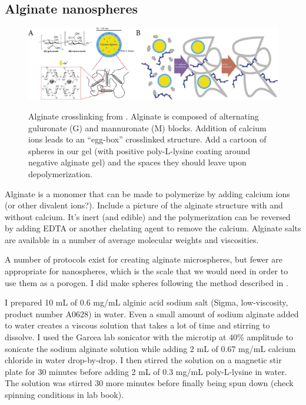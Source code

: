 \subsection{Alginate nanospheres}
\begin{figure}
\caption{Alginate crosslinking from \cite{bruchet15}. Alginate is composed of alternating guluronate (G) and mannuronate (M) blocks.  Addition of calcium ions leads to an ``egg-box'' crosslinked structure. Add a cartoon of spheres in our gel (with positive poly-L-lysine coating around negative alginate gel) and the spaces they should leave upon depolymerization.}
\centering
\includegraphics[width=\textwidth]{figs/ch03/alginate-cartoon}
\label{fig:alginate}
\end{figure}
Alginate is a monomer that can be made to polymerize by adding calcium ions (or other divalent ions?).  Include a picture of the alginate structure with and without calcium.  It's inert (and edible) and the polymerization can be reversed by adding EDTA or another chelating agent to remove the calcium.  Alginate salts are available in a number of average molecular weights and viscosities.

A number of protocols exist for creating alginate microspheres, but fewer are appropriate for nanospheres, which is the scale that we would need in order to use them as a porogen.  I did make spheres following the method described in \cite{de03}.

I prepared 10 mL of 0.6 mg/mL alginic acid sodium salt (Sigma, low-viscosity, product number A0628) in water.  Even a small amount of sodium alginate added to water creates a viscous solution that takes a lot of time and stirring to dissolve.  I used the Garcea lab sonicator with the microtip at 40\% amplitude to sonicate the sodium alginate solution while adding 2 mL of 0.67 mg/mL calcium chloride in water drop-by-drop.  I then stirred the solution on a magnetic stir plate for 30 minutes before adding 2 mL of 0.3 mg/mL poly-L-lysine in water.  The solution was stirred 30 more minutes before finally being spun down (check spinning conditions in lab book).

